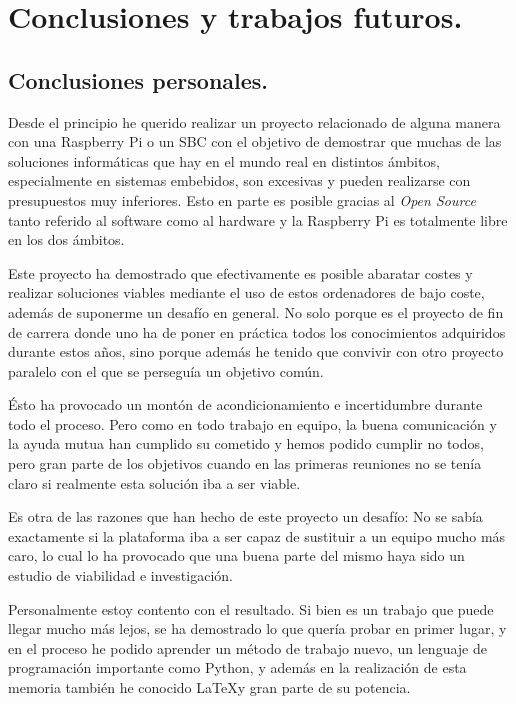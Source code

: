 \chapter{Conclusiones y trabajos futuros.}

\section{Conclusiones personales.}
	Desde el principio he querido realizar un proyecto relacionado de alguna manera con una Raspberry Pi o un SBC con el objetivo de demostrar que muchas de las soluciones informáticas que hay en el mundo real en distintos ámbitos, especialmente en sistemas embebidos, son excesivas y pueden realizarse con presupuestos muy inferiores. Esto en parte es posible gracias al \emph{Open Source} tanto referido al software como al hardware y la Raspberry Pi es totalmente libre en los dos ámbitos.
	
	Este proyecto ha demostrado que efectivamente es posible abaratar costes y realizar soluciones viables mediante el uso de estos ordenadores de bajo coste, además de suponerme un desafío en general. No solo porque es el proyecto de fin de carrera donde uno ha de poner en práctica todos los conocimientos adquiridos durante estos años, sino porque además he tenido que convivir con otro proyecto paralelo con el que se perseguía un objetivo común. 
	
	Ésto ha provocado un montón de acondicionamiento e incertidumbre durante todo el proceso. Pero como en todo trabajo en equipo, la buena comunicación y la ayuda mutua han cumplido su cometido y hemos podido cumplir no todos, pero gran parte de los objetivos cuando en las primeras reuniones no se tenía claro si realmente esta solución iba a ser viable.
	
	Es otra de las razones que han hecho de este proyecto un desafío: No se sabía exactamente si la plataforma iba a ser capaz de sustituir a un equipo mucho más caro, lo cual lo ha provocado que una buena parte del mismo haya sido un estudio de viabilidad e investigación. 
	
	Personalmente estoy contento con el resultado. Si bien es un trabajo que puede llegar mucho más lejos, se ha demostrado lo que quería probar en primer lugar, y en el proceso he podido aprender un método de trabajo nuevo, un lenguaje de programación importante como Python, y además en la realización de esta memoria también he conocido \LaTeX  y gran parte de su potencia.
	
